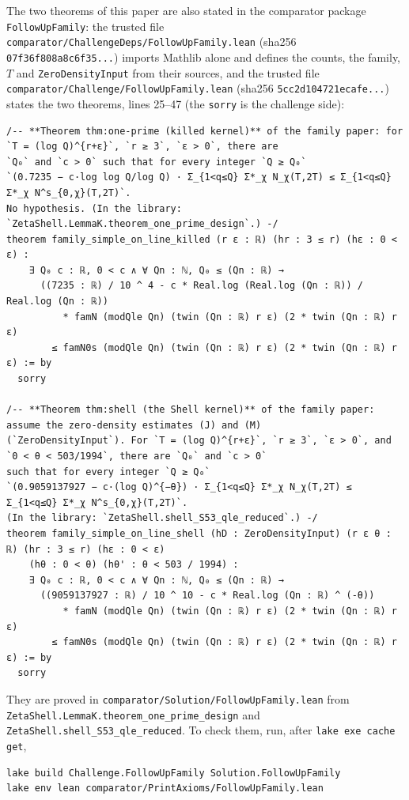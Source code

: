 The two theorems of this paper are also stated in the comparator package \texttt{FollowUpFamily}: the trusted file \texttt{comparator/ChallengeDeps/FollowUpFamily.lean} (sha256
\texttt{07f36f808a8c6f35...}) imports Mathlib alone and defines the counts, the family, $T$ and \texttt{ZeroDensityInput} from their sources, and the trusted file
\texttt{comparator/Challenge/FollowUpFamily.lean} (sha256 \texttt{5cc2d104721ecafe...}) states the two theorems, lines 25--47 (the \texttt{sorry} is the challenge side):
\begin{Verbatim}[fontsize=\footnotesize,breaklines,frame=single,framesep=2mm]
/-- **Theorem thm:one-prime (killed kernel)** of the family paper: for `T = (log Q)^{r+ε}`, `r ≥ 3`, `ε > 0`, there are
`Q₀` and `c > 0` such that for every integer `Q ≥ Q₀`
`(0.7235 − c·log log Q/log Q) · Σ_{1<q≤Q} Σ*_χ N_χ(T,2T) ≤ Σ_{1<q≤Q} Σ*_χ N^s_{0,χ}(T,2T)`.
No hypothesis. (In the library: `ZetaShell.LemmaK.theorem_one_prime_design`.) -/
theorem family_simple_on_line_killed (r ε : ℝ) (hr : 3 ≤ r) (hε : 0 < ε) :
    ∃ Q₀ c : ℝ, 0 < c ∧ ∀ Qn : ℕ, Q₀ ≤ (Qn : ℝ) →
      ((7235 : ℝ) / 10 ^ 4 - c * Real.log (Real.log (Qn : ℝ)) / Real.log (Qn : ℝ))
          * famN (modQle Qn) (twin (Qn : ℝ) r ε) (2 * twin (Qn : ℝ) r ε)
        ≤ famN0s (modQle Qn) (twin (Qn : ℝ) r ε) (2 * twin (Qn : ℝ) r ε) := by
  sorry

/-- **Theorem thm:shell (the Shell kernel)** of the family paper: assume the zero-density estimates (J) and (M)
(`ZeroDensityInput`). For `T = (log Q)^{r+ε}`, `r ≥ 3`, `ε > 0`, and `0 < θ < 503/1994`, there are `Q₀` and `c > 0`
such that for every integer `Q ≥ Q₀`
`(0.9059137927 − c·(log Q)^{−θ}) · Σ_{1<q≤Q} Σ*_χ N_χ(T,2T) ≤ Σ_{1<q≤Q} Σ*_χ N^s_{0,χ}(T,2T)`.
(In the library: `ZetaShell.shell_S53_qle_reduced`.) -/
theorem family_simple_on_line_shell (hD : ZeroDensityInput) (r ε θ : ℝ) (hr : 3 ≤ r) (hε : 0 < ε)
    (hθ : 0 < θ) (hθ' : θ < 503 / 1994) :
    ∃ Q₀ c : ℝ, 0 < c ∧ ∀ Qn : ℕ, Q₀ ≤ (Qn : ℝ) →
      ((9059137927 : ℝ) / 10 ^ 10 - c * Real.log (Qn : ℝ) ^ (-θ))
          * famN (modQle Qn) (twin (Qn : ℝ) r ε) (2 * twin (Qn : ℝ) r ε)
        ≤ famN0s (modQle Qn) (twin (Qn : ℝ) r ε) (2 * twin (Qn : ℝ) r ε) := by
  sorry
\end{Verbatim}
They are proved in \texttt{comparator/Solution/FollowUpFamily.lean} from \texttt{ZetaShell.LemmaK.theorem\_one\_prime\_design} and
\texttt{ZetaShell.shell\_S53\_qle\_reduced}. To check them, run, after \texttt{lake exe cache get},
\begin{Verbatim}[fontsize=\small,xleftmargin=1em]
lake build Challenge.FollowUpFamily Solution.FollowUpFamily
lake env lean comparator/PrintAxioms/FollowUpFamily.lean
\end{Verbatim}
